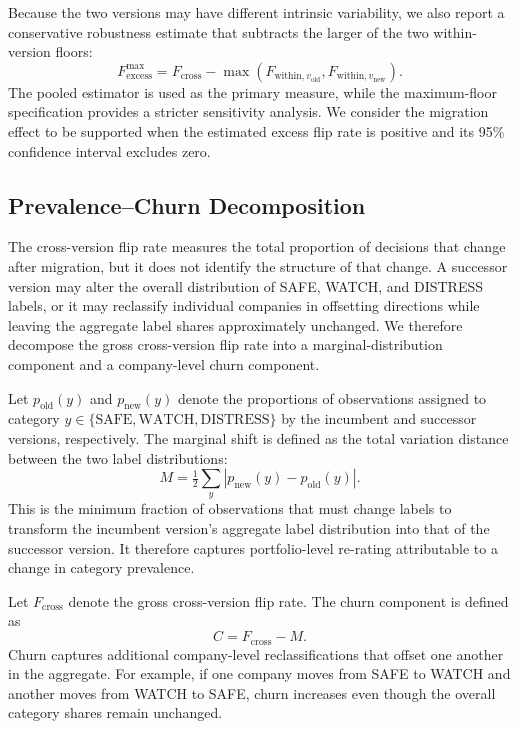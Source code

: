 \documentclass[11pt]{article}
\begin{document}
Because the two versions may have different intrinsic variability, we also report a conservative robustness estimate that subtracts the larger of the two within-version floors:
\begin{equation}
F_{\mathrm{excess}}^{\mathrm{max}} = F_{\mathrm{cross}} - \max\!\left( F_{\mathrm{within},v_{\mathrm{old}}}, F_{\mathrm{within},v_{\mathrm{new}}} \right).
\end{equation}
The pooled estimator is used as the primary measure, while the maximum-floor specification provides a stricter sensitivity analysis. We consider the migration effect to be supported when the estimated excess flip rate is positive and its 95\% confidence interval excludes zero.

\subsection{Prevalence--Churn Decomposition}
The cross-version flip rate measures the total proportion of decisions that change after migration, but it does not identify the structure of that change. A successor version may alter the overall distribution of SAFE, WATCH, and DISTRESS labels, or it may reclassify individual companies in offsetting directions while leaving the aggregate label shares approximately unchanged. We therefore decompose the gross cross-version flip rate into a marginal-distribution component and a company-level churn component.

Let $p_{\mathrm{old}}(y)$ and $p_{\mathrm{new}}(y)$ denote the proportions of observations assigned to category $y\in\{\text{SAFE},\text{WATCH},\text{DISTRESS}\}$ by the incumbent and successor versions, respectively. The marginal shift is defined as the total variation distance between the two label distributions:
\begin{equation}
M = \tfrac{1}{2} \sum_{y} \left| p_{\mathrm{new}}(y) - p_{\mathrm{old}}(y) \right|.
\end{equation}
This is the minimum fraction of observations that must change labels to transform the incumbent version's aggregate label distribution into that of the successor version. It therefore captures portfolio-level re-rating attributable to a change in category prevalence.

Let $F_{\mathrm{cross}}$ denote the gross cross-version flip rate. The churn component is defined as
\begin{equation}
C = F_{\mathrm{cross}}-M.
\end{equation}
Churn captures additional company-level reclassifications that offset one another in the aggregate. For example, if one company moves from SAFE to WATCH and another moves from WATCH to SAFE, churn increases even though the overall category shares remain unchanged.
\end{document}
